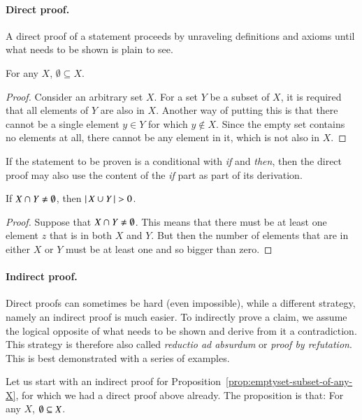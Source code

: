 \documentclass[nobib,nofonts]{tufte-handout}
\begin{document}
\paragraph{Direct proof.}

A direct proof of a statement proceeds by unraveling definitions and axioms until what needs to be shown is plain to see.

\begin{proposition}
  \label{prop:emptyset-subset-of-any-X}
  For any $X$, $\emptyset \subseteq X$.
\end{proposition}

\begin{proof}
  Consider an arbitrary set $X$. For a set $Y$ be a subset of $X$, it is required that all elements of $Y$ are also in $X$. Another way of putting this is that there cannot be a single element $y \in Y$ for which $y \not \in X$. Since the empty set contains no elements at all, there cannot be any element in it, which is not also in $X$.
\end{proof}

If the statement to be proven is a conditional with \emph{if} and \emph{then}, then the direct proof may also use the content of the \emph{if} part as part of its derivation.

\begin{proposition}
  If $X \cap Y \neq \emptyset$, then $\left \lvert \, X \cup Y \, \right\rvert > 0$.
\end{proposition}

\begin{proof}
  Suppose that $X \cap Y \neq \emptyset$. This means that there must be at least one element $z$ that
  is in both $X$ and $Y$. But then the number of elements that are in either $X$ or $Y$ must be
  at least one and so bigger than zero.
\end{proof}

\paragraph{Indirect proof.}

Direct proofs can sometimes be hard (even impossible), while a different strategy, namely an indirect proof is much easier.
To indirectly prove a claim, we assume the logical opposite of what needs to be shown and derive from it a contradiction.
This strategy is therefore also called \emph{reductio ad absurdum} or \emph{proof by refutation}.
This is best demonstrated with a series of examples.

Let us start with an indirect proof for Proposition~\ref{prop:emptyset-subset-of-any-X}, for which we had a direct proof above already.
The proposition is that: For any $X$, $\emptyset \subseteq X$.
\end{document}
